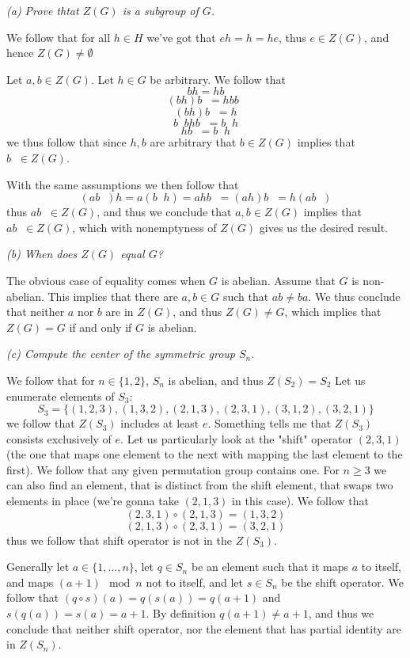 \documentclass[11pt,oneside,titlepage]{book}
\DeclareMathOperator \inv {^{-1}}
\newcommand{\set}[1]{\{ #1 \}}
\begin{document}
\textit{(a) Prove thtat $Z(G)$ is a subgroup of $G$.}

We follow that for all $h \in H$ we've got that $eh = h = he$, thus
$e \in Z(G)$, and hence $Z(G) \neq \emptyset$

Let $a, b \in Z(G)$. Let $h \in G$ be arbitrary. We follow that
$$bh = hb$$
$$(bh)b\inv = h b b\inv$$
$$(bh)b\inv = h$$
$$b\inv b h b\inv = b\inv h$$
$$h b\inv = b\inv h$$
we thus follow that since $h, b$ are arbitrary that $b \in Z(G)$
implies that $b\inv \in Z(G)$.

With the same assumptions we then follow that
$$(a b\inv) h = a (b\inv h) = a h b\inv = (a h) b\inv = h (a b\inv)$$
thus $a b\inv \in Z(G)$, and thus we conclude that $a, b \in Z(G)$
implies that $ab\inv \in Z(G)$, which with nonemptyness of $Z(G)$
gives us the desired result.

\textit{(b) When does $Z(G)$ equal $G$?}

The obvious case of equality comes when $G$ is abelian. Assume that
$G$ is non-abelian. This implies that there are $a, b \in G$ such that
$ab \neq b a $. We thus conclude that neither $a$ nor $b$ are in
$Z(G)$, and thus $Z(G) \neq G$, which implies that $Z(G) = G$ if and
only if $G$ is abelian.

\textit{(c) Compute the center of the symmetric group $S_n$.}

We follow that for $n \in \set{1, 2}$, $S_n$ is abelian, and thus
$Z(S_2) = S_2$
Let us enumerate elements of $S_3$:
$$S_3 = \set{(1, 2, 3), (1, 3, 2), (2, 1, 3),
  (2, 3, 1), (3, 1, 2), (3, 2, 1) } $$
we follow that $Z(S_3)$ includes at least $e$. Something tells me that
$Z(S_3)$ consists exclusively of $e$. Let us particularly look at the
"shift" operator $(2, 3, 1)$ (the one that maps one element to the
next with mapping the last element to the first). We follow that any
given permutation group contains one. For $n \geq 3$ we can also find
an element, that is distinct from the shift element, that swaps two
elements in place (we're gonna take $(2, 1, 3)$ in this case). We
follow that
$$(2, 3, 1) \circ (2, 1, 3) = (1, 3, 2)$$
$$(2, 1, 3) \circ (2, 3, 1) = (3, 2, 1)$$
thus we follow that shift operator is not in the $Z(S_3)$.

Generally let $a \in \set{1, ..., n}$, let $q \in S_n$ be an element
such that it maps $a$ to itself, and maps $(a + 1) \mod n$ not to
itself, and let $s \in S_n$ be the shift operator. We follow that $(q
\circ s) (a) = q(s(a)) = q(a + 1)$ and $s(q(a)) = s(a) = a + 1$. By
definition $q(a + 1) \neq a + 1$, and thus we conclude that neither
shift operator, nor the element that has partial identity are in
$Z(S_n)$.
\end{document}
